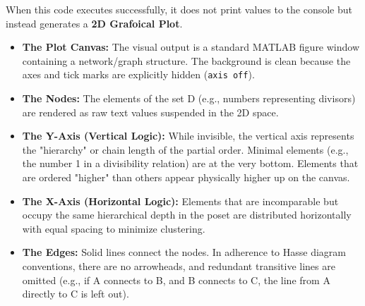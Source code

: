 When this code executes successfully, it does not print values to the console but instead generates a \textbf{2D Grafoical Plot}.

\begin{itemize}
\item \textbf{The Plot Canvas:} The visual output is a standard MATLAB figure window containing a network/graph structure. The background is clean because the axes and tick marks are explicitly hidden (\texttt{axis off}).
\item \textbf{The Nodes:} The elements of the set D (e.g., numbers representing divisors) are rendered as raw text values suspended in the 2D space.
\item \textbf{The Y-Axis (Vertical Logic):} While invisible, the vertical axis represents the "hierarchy" or chain length of the partial order. Minimal elements (e.g., the number 1 in a divisibility relation) are at the very bottom. Elements that are ordered "higher" than others appear physically higher up on the canvas.
\item \textbf{The X-Axis (Horizontal Logic):} Elements that are incomparable but occupy the same hierarchical depth in the poset are distributed horizontally with equal spacing to minimize clustering.
\item \textbf{The Edges:} Solid lines connect the nodes. In adherence to Hasse diagram conventions, there are no arrowheads, and redundant transitive lines are omitted (e.g., if A connects to B, and B connects to C, the line from A directly to C is left out).
\end{itemize}

